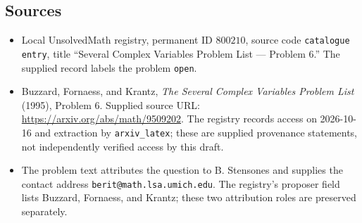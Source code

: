 \documentclass[11pt]{article}
\begin{document}
\subsection{Sources}
\begin{itemize}
\item Local UnsolvedMath registry, permanent ID \(800210\), source code \texttt{catalogue entry}, title ``Several Complex Variables Problem List --- Problem 6.'' The supplied record labels the problem \texttt{open}.
\item Buzzard, Fornaess, and Krantz, \emph{The Several Complex Variables Problem List} (1995), Problem 6. Supplied source URL: \url{https://arxiv.org/abs/math/9509202}. The registry records access on 2026-10-16 and extraction by \texttt{arxiv\_latex}; these are supplied provenance statements, not independently verified access by this draft.
\item The problem text attributes the question to B. Stensones and supplies the contact address \texttt{berit@math.lsa.umich.edu}. The registry's proposer field lists Buzzard, Fornaess, and Krantz; these two attribution roles are preserved separately.
\end{itemize}
\end{document}
